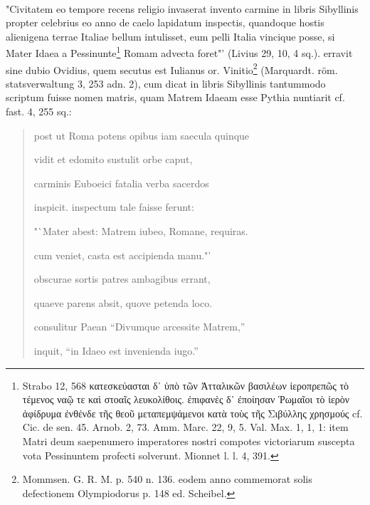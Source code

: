 \documentclass[a4paper, 11pt, oneside, polutonikogreek, german]{article}
\begin{document}
\paragraph{}
"Civitatem eo tempore recens religio invaserat invento carmine in libris Sibyllinis propter celebrius eo anno de caelo lapidatum inspectis, quandoque hostis alienigena terrae Italiae bellum intulisset, eum pelli Italia vincique posse, si Mater Idaea a Pessinunte\footnote{Strabo 12, 568 κατεσκεύασται δ᾽ ὑπὸ τῶν Ἀτταλικῶν βασιλέων ἱεροπρεπῶς τὸ τέμενος ναῷ τε καὶ στοαῖς λευκολίθοις. ἐπιφανὲς δ᾽ ἐποίησαν Ῥωμαῖοι τὸ ἱερὸν ἀφίδρυμα ἐνθένδε τῆς θεοῦ μεταπεμψάμενοι κατὰ τοὺς τῆς Σιβύλλης χρησμούς cf. Cic. de sen. 45. Arnob. 2, 73. Amm. Marc. 22, 9, 5. Val. Max. 1, 1, 1: item Matri deum saepenumero imperatores nostri compotes victoriarum suscepta vota Pessinuntem profecti solverunt. Mionnet l. l. 4, 391.} Romam advecta foret"' (Livius 29, 10, 4 sq.). erravit sine dubio Ovidius, quem secutus est Iulianus or. Vinitio\footnote{Mommsen. G. R. M. p. 540 n. 136. eodem anno commemorat solis defectionem Olympiodorus p. 148 ed. Scheibel.} (Marquardt. röm. statsverwaltung 3, 253 adn. 2), cum dicat in libris Sibyllinis tantummodo scriptum fuisse nomen matris, quam Matrem Idaeam esse Pythia nuntiarit cf. fast. 4, 255 sq.:
\begin{quotation}
post ut Roma potens opibus iam saecula quinque

vidit et edomito sustulit orbe caput,

carminis Euboeici fatalia verba sacerdos

inspicit. inspectum tale faisse ferunt:

"`Mater abest: Matrem iubeo, Romane, requiras.

cum veniet, casta est accipienda manu."'

obscurae sortis patres ambagibus errant,

quaeve parens absit, quove petenda loco.

consulitur Paean "`Divumque arcessite Matrem,"'

inquit, "`in Idaeo est invenienda iugo."'
\end{quotation}
\end{document}
